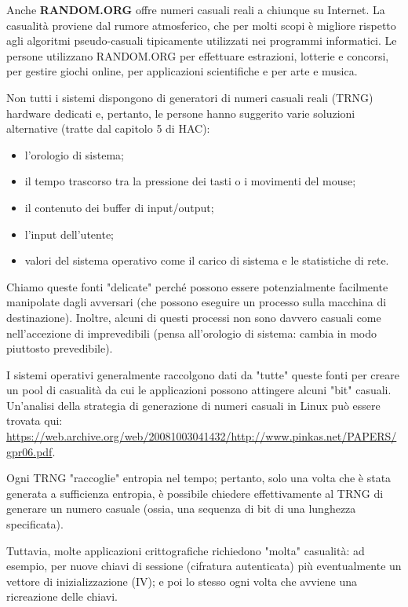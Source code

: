 \documentclass[11pt]{article}
\theoremstyle{definition} \newtheorem{definizione}{Definizione}[section] %
\begin{document}
        Anche \textbf{RANDOM.ORG} offre numeri casuali reali a chiunque su Internet. La casualità proviene dal rumore atmosferico, che per molti scopi è migliore rispetto agli algoritmi pseudo-casuali tipicamente utilizzati nei programmi informatici. Le persone utilizzano RANDOM.ORG per effettuare estrazioni, lotterie e concorsi, per gestire giochi online, per applicazioni scientifiche e per arte e musica.
        
        Non tutti i sistemi dispongono di generatori di numeri casuali reali (TRNG) hardware dedicati e, pertanto, le persone hanno suggerito varie soluzioni alternative (tratte dal capitolo 5 di HAC):
        \begin{itemize}
        \item l'orologio di sistema;
        \item il tempo trascorso tra la pressione dei tasti o i movimenti del mouse;
        \item il contenuto dei buffer di input/output;
        \item l'input dell'utente;
        \item valori del sistema operativo come il carico di sistema e le statistiche di rete.
        \end{itemize}

        Chiamo queste fonti "delicate" perché possono essere potenzialmente facilmente manipolate dagli avversari (che possono eseguire un processo sulla macchina di destinazione). Inoltre, alcuni di questi processi non sono davvero casuali come nell'accezione di imprevedibili (pensa all'orologio di sistema: cambia in modo piuttosto prevedibile).

        I sistemi operativi generalmente raccolgono dati da "tutte" queste fonti per creare un pool di casualità da cui le applicazioni possono attingere alcuni "bit" casuali. Un'analisi della strategia di generazione di numeri casuali in Linux può essere trovata qui: \url{https://web.archive.org/web/20081003041432/http://www.pinkas.net/PAPERS/gpr06.pdf}.
        
        Ogni TRNG "raccoglie" entropia nel tempo; pertanto, solo una volta che è stata generata a sufficienza entropia, è possibile chiedere effettivamente al TRNG di generare un numero casuale (ossia, una sequenza di bit di una lunghezza specificata).

        Tuttavia, molte applicazioni crittografiche richiedono "molta" casualità: ad esempio, per nuove chiavi di sessione (cifratura autenticata) più eventualmente un vettore di inizializzazione (IV); e poi lo stesso ogni volta che avviene una ricreazione delle chiavi.
\end{document}

